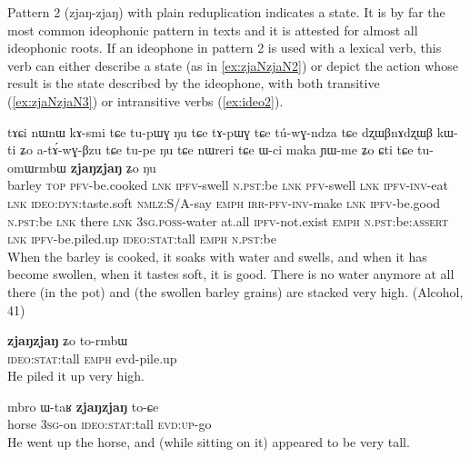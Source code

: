 \documentclass[oldfontcommands,oneside,a4paper,11pt]{article}
\newcommand{\ipa}[1]{{\phon \mbox{#1}}} %
\begin{document}
Pattern 2 (\ipa{zjaŋ-zjaŋ}) with plain reduplication  indicates a state. It is by far the most common ideophonic pattern in texts and it is attested for almost all ideophonic roots.  If an ideophone in pattern 2 is used with a lexical verb, this verb can either describe a state (as in \ref{ex:zjaNzjaN2}) or depict the action whose result is the state described by the ideophone, with both transitive (\ref{ex:zjaNzjaN3}) or intransitive verbs (\ref{ex:ideo2}).

 
 
  \begin{exe} 
\ex  \label{ex:zjaNzjaN2}
\gll 
 \ipa{tɤɕi}  	\ipa{nɯnɯ}  	\ipa{kɤ-smi}  	\ipa{tɕe}  	\ipa{tu-pɯɣ}  	\ipa{ŋu}  	\ipa{tɕe}  	\ipa{tɤ-pɯɣ}  	\ipa{tɕe}  	\ipa{tú-wɣ-ndza}  	\ipa{tɕe}  	\ipa{dʐɯβnɤdʐɯβ}  	\ipa{kɯ-ti}  	\ipa{ʑo}  	\ipa{a-tɤ́-wɣ-βzu}  	\ipa{tɕe}  	\ipa{tu-pe}  	\ipa{ŋu}  	\ipa{tɕe}  	\ipa{nɯreri}  	\ipa{tɕe}  	\ipa{ɯ-ci}  	\ipa{maka}  	\ipa{ɲɯ-me}  	\ipa{ʑo}  	\ipa{ɕti}  	\ipa{tɕe}  	\ipa{tu-omɯrmbɯ}  	\ipa{\textbf{zjaŋzjaŋ}}  	\ipa{ʑo}  	\ipa{ŋu}  \\
 barley \textsc{top} \textsc{pfv}-be.cooked \textsc{lnk} \textsc{ipfv}-swell \textsc{n.pst}:be \textsc{lnk} \textsc{pfv}-swell \textsc{lnk} \textsc{ipfv-inv}-eat \textsc{lnk} \textsc{ideo:dyn}:taste.soft \textsc{nmlz}:S/A-say \textsc{emph} \textsc{irr-pfv-inv}-make \textsc{lnk} \textsc{ipfv}-be.good \textsc{n.pst}:be \textsc{lnk} there \textsc{lnk} \textsc{3sg.poss}-water at.all \textsc{ipfv}-not.exist  \textsc{emph} \textsc{n.pst}:be:\textsc{assert} \textsc{lnk} \textsc{ipfv}-be.piled.up \textsc{ideo:stat}:tall \textsc{emph} \textsc{n.pst}:be  \\
 \glt When the barley is cooked, it soaks with water and swells, and when it has become swollen, when it tastes soft, it is good. There is no water anymore at all there (in the pot) and (the swollen barley grains) are stacked very high.  (Alcohol, 41)
 \end{exe}
 
  \begin{exe} 
\ex  \label{ex:zjaNzjaN3}
\gll 
\ipa{\textbf{zjaŋzjaŋ}}  \ipa{ʑo} \ipa{to-rmbɯ} \\
 \textsc{ideo:stat}:tall \textsc{emph} evd-pile.up \\
 \glt He piled it up very high.
  \end{exe}
 \begin{exe} 
\ex  \label{ex:ideo2}
\gll 
\ipa{mbro}  	\ipa{ɯ-taʁ}  	\ipa{\textbf{zjaŋzjaŋ}}  	\ipa{to-ɕe}  \\
horse \textsc{3sg}-on \textsc{ideo:stat}:tall  \textsc{evd:up}-go \\
\glt He went up the horse, and (while sitting on it) appeared to be very tall.  
 \end{exe}
 
\end{document}
